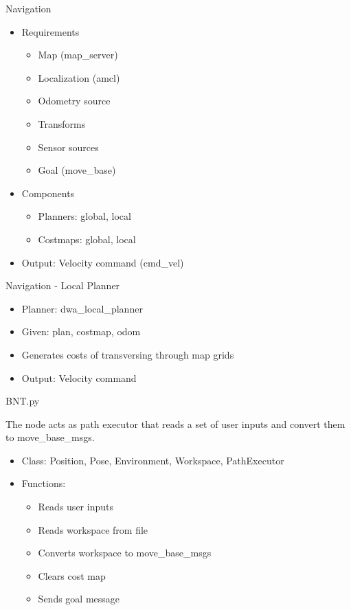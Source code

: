 \begin{frame}{Navigation}
\begin{itemize}
	\item Requirements
		\begin{itemize}
			\item Map (map\_server)
			\item Localization (amcl)
			\item Odometry source
			\item Transforms
			\item Sensor sources
			\item Goal (move\_base) 
		\end{itemize}
	\item Components
		\begin{itemize}
			\item Planners: global, local
			\item Costmaps: global, local
		\end{itemize}
	\item Output: Velocity command (cmd\_vel)
\end{itemize}
\end{frame}
\begin{frame}{Navigation - Local Planner}
\begin{itemize}
	\item Planner: dwa\_local\_planner
	\item Given: plan, costmap, odom
	\item Generates costs of transversing through map grids
	\item Output: Velocity command
\end{itemize}
\end{frame}
\begin{frame}{BNT.py}
    
    The node acts as path executor that reads  a set of user inputs and convert them to move\_base\_msgs.
    \begin{itemize}
        \item Class: Position, Pose, Environment, Workspace, PathExecutor
        
        \item Functions:
        \begin{itemize}
        	\item Reads user inputs
        	\item Reads workspace from file
            \item Converts workspace to move\_base\_msgs
            \item Clears cost map
            \item Sends goal message
        \end{itemize}
    \end{itemize}
    
\end{frame}
